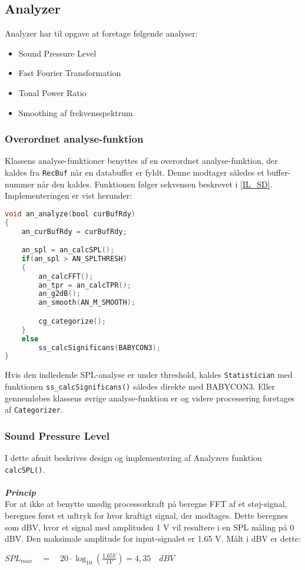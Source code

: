 \subsection*{Analyzer}
Analyzer har til opgave at foretage følgende analyser:
\begin{itemize}
	\item Sound Pressure Level
	\item Fast Fourier Transformation
	\item Tonal Power Ratio
	\item Smoothing af frekvensspektrum
\end{itemize}

\subsubsection{Overordnet analyse-funktion}
Klassens analyse-funktioner benyttes af en overordnet analyse-funktion, der kaldes fra \verb+RecBuf+ når en databuffer er fyldt. Denne modtager således et buffer-nummer når den kaldes. Funktionen følger sekvensen beskrevet i \ref{IL_SD}. Implementeringen er vist herunder:
\begin{lstlisting}[language=C,numbers=none]
void an_analyze(bool curBufRdy)
{
    an_curBufRdy = curBufRdy;

    an_spl = an_calcSPL();
    if(an_spl > AN_SPLTHRESH)
    {
        an_calcFFT();			
        an_tpr = an_calcTPR();
        an_g2dB();
        an_smooth(AN_M_SMOOTH);

        cg_categorize();
    }
    else
        ss_calcSignificans(BABYCON3);
}\end{lstlisting}

Hvis den indledende SPL-analyse er under threshold, kaldes \verb+Statistician+ med funktionen \verb+ss_calcSignificans()+ således direkte med BABYCON3. Eller gennemløbes klassens øvrige analyse-funktion er og videre processering foretages af \verb+Categorizer+.

\subsubsection{Sound Pressure Level} \label{an_spl}
I dette afsnit beskrives design og implementering af Analyzers funktion \verb+calcSPL()+.\\ \\
\textbf{\textit{Princip}}\\
For at ikke at benytte unødig processorkraft på beregne FFT af et støj-signal, beregnes først et udtryk for hvor kraftigt signal, der modtages. Dette beregnes som dBV, hvor et signal med amplituden 1 V vil resultere i en SPL måling på 0 dBV. Den maksimale amplitude for input-signalet er 1.65 V. Målt i dBV er dette:
\begin{center}
${ SPL }_{ max }\quad =\quad 20\cdot \log _{ 10 }{ \left( \frac { 1.65V }{ 1V }  \right)  } =4,35\quad dBV$
\end{center}

